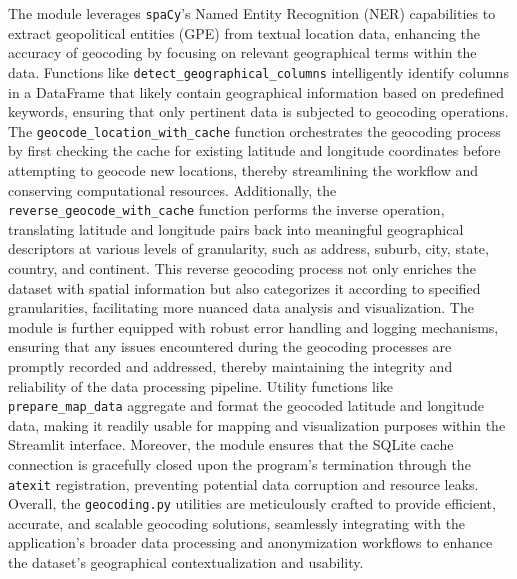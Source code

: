 \documentclass{article}
\begin{document}
The module leverages \texttt{spaCy}'s Named Entity Recognition (NER) capabilities to extract geopolitical entities (GPE) from textual location data, enhancing the accuracy of geocoding by focusing on relevant geographical terms within the data. Functions like \texttt{detect\_geographical\_columns} intelligently identify columns in a DataFrame that likely contain geographical information based on predefined keywords, ensuring that only pertinent data is subjected to geocoding operations. The \texttt{geocode\_location\_with\_cache} function orchestrates the geocoding process by first checking the cache for existing latitude and longitude coordinates before attempting to geocode new locations, thereby streamlining the workflow and conserving computational resources. Additionally, the \texttt{reverse\_geocode\_with\_cache} function performs the inverse operation, translating latitude and longitude pairs back into meaningful geographical descriptors at various levels of granularity, such as address, suburb, city, state, country, and continent. This reverse geocoding process not only enriches the dataset with spatial information but also categorizes it according to specified granularities, facilitating more nuanced data analysis and visualization. The module is further equipped with robust error handling and logging mechanisms, ensuring that any issues encountered during the geocoding processes are promptly recorded and addressed, thereby maintaining the integrity and reliability of the data processing pipeline. Utility functions like \texttt{prepare\_map\_data} aggregate and format the geocoded latitude and longitude data, making it readily usable for mapping and visualization purposes within the Streamlit interface. Moreover, the module ensures that the SQLite cache connection is gracefully closed upon the program's termination through the \texttt{atexit} registration, preventing potential data corruption and resource leaks. Overall, the \texttt{geocoding.py} utilities are meticulously crafted to provide efficient, accurate, and scalable geocoding solutions, seamlessly integrating with the application's broader data processing and anonymization workflows to enhance the dataset's geographical contextualization and usability.
\end{document}
